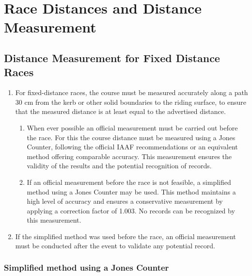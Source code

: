 \section{Race Distances and Distance Measurement}

\subsection {Distance Measurement for Fixed Distance Races}

\begin{enumerate}[leftmargin=1.5em,labelsep=*]
	\item For fixed-distance races, the course must be measured accurately along a path 30 cm from the kerb or other solid 
  boundaries to the riding surface, to ensure that the measured distance is at least equal to the advertised distance.
	\begin{enumerate}[label*=\arabic*,leftmargin=1.5em,labelsep=*]
		\item When ever possible an official measurement must be carried out before the race.
		For this the course distance must be measured using a Jones Counter, following the official IAAF recommendations or an equivalent method offering comparable accuracy.
		This measurement ensures the validity of the results and the potential recognition of records.
		\item If an official measurement before the race is not feasible, a simplified method using a Jones Counter may be used.
		This method maintains a high level of accuracy and ensures a conservative measurement by applying a correction factor of 1.003.
		No records can be recognized by this measurement.
	\end{enumerate}
	\item If the simplified method was used before the race, an official measurement must be conducted after the event to validate any potential record.
\end{enumerate}

\subsubsection {Simplified method using a Jones Counter}

